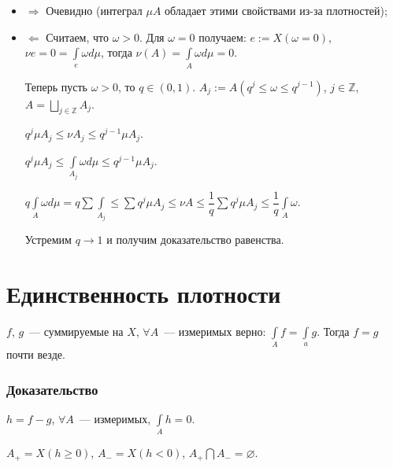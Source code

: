 \documentclass{article}
\begin{document}
            \begin{itemize}
            
                \item $\Rightarrow$ Очевидно (интеграл $\mu A$ обладает этими свойствами из-за плотностей);
                
                \item $\Leftarrow$ Считаем, что $\omega > 0$. Для $\omega = 0$ получаем: $e := X(\omega = 0)$, $\nu e = 0 = \int\limits_e \omega d \mu$, тогда $\nu (A) = \int\limits_{A} \omega d \mu = 0$. 
                
                Теперь пусть $\omega > 0$, то $q \in (0, 1)$. $A_j := A(q^j \leqslant \omega \leqslant q^{j - 1})$, $j \in \mathbb{Z}$, $A = \bigsqcup\limits_{j \in \mathbb{Z}} A_j$.
                
                    $q^j \mu A_j \leqslant \nu A_j \leqslant q^{j - 1} \mu A_j$.
                    
                    $q^j \mu A_j \leqslant \int\limits_{A_j} \omega d \mu \leqslant q^{j - 1} \mu A_j$.
                    
                    $q \int\limits_A \omega d \mu = q \sum \int\limits_{A_j} \leqslant \sum q^j \mu A_j \leqslant \nu A \leqslant \dfrac{1}{q} \sum q^j \mu A_j \leqslant \dfrac{1}{q} \int\limits_A \omega$.
                    
                    Устремим $q \rightarrow 1$ и получим доказательство равенства.
                    
            \end{itemize}
           
    \newpage
    
    \section{Единственность плотности}
    
        $f$, $g$~--- суммируемые на $X$, $\forall A$~--- измеримых верно: $\int\limits_A f = \int\limits_a g$. Тогда $f = g$ почти везде.
        
        \subsubsection{Доказательство}
        
            $h = f - g$, $\forall A$~--- измеримых, $\int\limits_A h = 0$.
            
            $A_+ = X(h \geqslant 0)$, $A_- = X(h < 0)$, $A_+ \bigcap A_- = \varnothing$.
            
\end{document}
